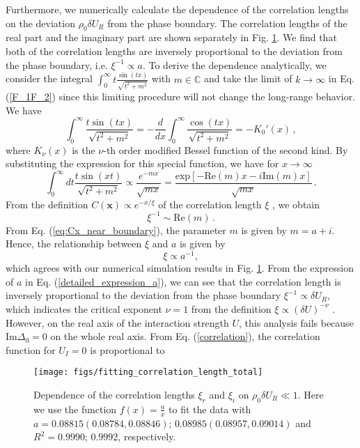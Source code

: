 \documentclass[aps,onecolumn,superscriptaddress,notitlepage,longbibliography]{revtex4-1}
\begin{document}
Furthermore, we numerically calculate the dependence of the correlation lengths on the deviation
$\rho_{0}\delta U_{R}$ from the phase boundary. The correlation lengths of the real part and the imaginary
part are shown separately in Fig. \ref{fig3}. We find that both of the correlation lengths are inversely proportional to the deviation from the phase boundary, i.e. $\xi^{-1}\propto a$. To derive the dependence analytically, we consider the integral $\int_0^{\infty}t\frac{\sin(tx)}{\sqrt{t^2+m^2}}$ with $m\in\mathbb{C}$ and take the limit of $k\to\infty$ in Eq. (\ref{F_1F_2}) since this limiting procedure will not change the long-range behavior. We have
\begin{equation}
   \int_0^{\infty}\frac{t\sin(tx)}{\sqrt{t^2+m^2}}=-\frac{d}{dx}\int_0^{\infty}\frac{\cos(tx)}{\sqrt{t^2+m^2}}=-K_0'(x)\,,
\end{equation}
where $K_{\nu}(x)$ is the $\nu$-th order modified Bessel function of the second kind. By substituting the expression for this special function, we have for $x\rightarrow\infty$
\begin{equation}
\int_{0}^{\infty}dt\frac{t\sin(xt)}{\sqrt{t^{2}+m^{2}}}\propto \frac{e^{-mx}}{\sqrt{mx}}= \frac{\text{exp}[-\text{Re}(m)x-i\text{Im}(m)x]}{\sqrt{mx}}\,.
\end{equation}
From the definition $C(\bm{x})\propto e^{-x/\xi}$ of the correlation length $\xi$ \cite{Sachdev:2011uj}, we obtain
\begin{equation}
    \xi^{-1}\sim\text{Re}(m)\,.
\end{equation}
From Eq. (\ref{eq:Cx_near_boundary}), the parameter $m$ is given by $m=a+i$. Hence, the relationship between $\xi$ and $a$ is given by
\begin{equation}
  \xi\propto a^{-1},\label{corre_length}
\end{equation}
which agrees with our numerical simulation results in Fig. \ref{fig3}. From the expression of $a$ in Eq. (\ref{detailed_expression_a}), we can see that the correlation length is inversely proportional to the deviation from the phase boundary $\xi^{-1}\propto\delta U_R$, which indicates the critical exponent $\nu=1$ from the definition $\xi\propto(\delta U)^{-\nu}$ \cite{Sachdev:2011uj}. However, on the real axis of the interaction strength $U$, this analysis fails because $\text{Im}\Delta_0=0$ on the whole real axis. From Eq. (\ref{correlation}),  the correlation function for $U_I=0$ is proportional to
\begin{figure}
	\centering \texttt{[image: figs/fitting\_correlation\_length\_total]}
	\caption{Dependence of the correlation lengths $\xi_r$ and $\xi_i$ on $\rho_{0}\delta U_{R}\ll1$. Here we use the function $f(x)=\frac{a}{x}$ to fit the data with
		$a=0.08815(0.08784,0.08846)$; $0.08985(0.08957,0.09014)$ and $R^{2}=0.9990$;
		$0.9992$, respectively.}
	\label{fig3}
\end{figure}
\end{document}
